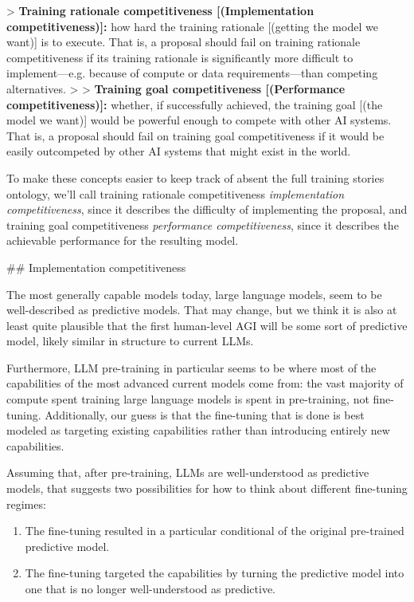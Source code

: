 {> \textbf{Training rationale competitiveness [(Implementation competitiveness)]:} how hard the training rationale [(getting the model we want)] is to execute. That is, a proposal should fail on training rationale competitiveness if its training rationale is significantly more difficult to implement---e.g. because of compute or data requirements---than competing alternatives.
>
> \textbf{Training goal competitiveness [(Performance competitiveness)]:} whether, if successfully achieved, the training goal [(the model we want)] would be powerful enough to compete with other AI systems. That is, a proposal should fail on training goal competitiveness if it would be easily outcompeted by other AI systems that might exist in the world.

To make these concepts easier to keep track of absent the full training stories ontology\cite{TODO: cite https://www.alignmentforum.org/posts/FDJnZt8Ks2djouQTZ/how-do-we-become-confident-in-the-safety-of-a-machine}, we'll call training rationale competitiveness \textit{implementation competitiveness}, since it describes the difficulty of implementing the proposal, and training goal competitiveness \textit{performance competitiveness}, since it describes the achievable performance for the resulting model.


## Implementation competitiveness

The most generally capable models today, large language models, seem to be well-described as predictive models. That may change, but we think it is also at least quite plausible that the first human-level AGI will be some sort of predictive model, likely similar in structure to current LLMs.

Furthermore, LLM pre-training in particular seems to be where most of the capabilities of the most advanced current models come from: the vast majority of compute spent training large language models is spent in pre-training, not fine-tuning. Additionally, our guess is that the fine-tuning that is done is best modeled as targeting existing capabilities rather than introducing entirely new capabilities.

Assuming that, after pre-training, LLMs are well-understood as predictive models, that suggests two possibilities for how to think about different fine-tuning regimes:



\begin{enumerate}
\item The fine-tuning resulted in a particular conditional of the original pre-trained predictive model.
\item The fine-tuning targeted the capabilities by turning the predictive model into one that is no longer well-understood as predictive.
\end{enumerate}

}
